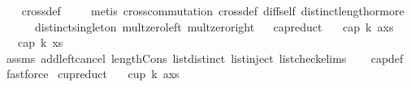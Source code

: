 \begin{isabellebody}
%
\isadelimproof
\ \ %
\endisadelimproof
%
\isatagproof
{}\isamarkupfalse%
\ cross{}{\isacharunderscore}{\kern0pt}def\ \isanewline
\ \ \isamarkupfalse%
\ {\isacharparenleft}{\kern0pt}metis\ cross{}{\isacharunderscore}{\kern0pt}commutation{\isacharunderscore}{\kern0pt}{}{}\ cross{}{\isacharunderscore}{\kern0pt}def\ diff{\isacharunderscore}{\kern0pt}self\ distinct{\isacharunderscore}{\kern0pt}length{\isacharunderscore}{\kern0pt}{}{\isacharunderscore}{\kern0pt}or{\isacharunderscore}{\kern0pt}more\isanewline
\ \ \ \ \ \ distinct{\isacharunderscore}{\kern0pt}singleton\ mult{\isacharunderscore}{\kern0pt}zero{\isacharunderscore}{\kern0pt}left\ mult{\isacharunderscore}{\kern0pt}zero{\isacharunderscore}{\kern0pt}right{\isacharparenright}{\kern0pt}%
\endisatagproof
{\isafoldproof}%
%
\isadelimproof
\ \isanewline
%
\endisadelimproof
\isanewline
{}\isamarkupfalse%
\ cap{\isacharunderscore}{\kern0pt}reduct{\isacharcolon}{\kern0pt}\isanewline
\ \ \ {\isachardoublequoteopen}cap\ {\isacharparenleft}{\kern0pt}k{\isacharplus}{\kern0pt}{}{\isacharparenright}{\kern0pt}\ {\isacharparenleft}{\kern0pt}a{\isacharhash}{\kern0pt}xs{\isacharparenright}{\kern0pt}{\isachardoublequoteclose}\isanewline
\ \ \ {\isachardoublequoteopen}cap\ k\ xs{\isachardoublequoteclose}\isanewline
%
\isadelimproof
\ \ %
\endisadelimproof
%
\isatagproof
{}\isamarkupfalse%
\ assms\ add{\isacharunderscore}{\kern0pt}left{\isacharunderscore}{\kern0pt}cancel\ length{\isacharunderscore}{\kern0pt}Cons\ list{\isachardot}{\kern0pt}distinct{\isacharparenleft}{\kern0pt}{}{\isacharparenright}{\kern0pt}\ list{\isachardot}{\kern0pt}inject\ list{\isacharunderscore}{\kern0pt}check{\isachardot}{\kern0pt}elims{\isacharparenleft}{\kern0pt}{}{\isacharparenright}{\kern0pt}\isanewline
\ \ \isamarkupfalse%
\ cap{\isacharunderscore}{\kern0pt}def\ \isamarkupfalse%
\ fastforce%
\endisatagproof
{\isafoldproof}%
%
\isadelimproof
\isanewline
%
\endisadelimproof
\isanewline
{}\isamarkupfalse%
\ cup{\isacharunderscore}{\kern0pt}reduct{\isacharcolon}{\kern0pt}\isanewline
\ \ \ {\isachardoublequoteopen}cup\ {\isacharparenleft}{\kern0pt}k{\isacharplus}{\kern0pt}{}{\isacharparenright}{\kern0pt}\ {\isacharparenleft}{\kern0pt}a{\isacharhash}{\kern0pt}xs{\isacharparenright}{\kern0pt}{\isachardoublequoteclose}\isanewline

\end{isabellebody}
